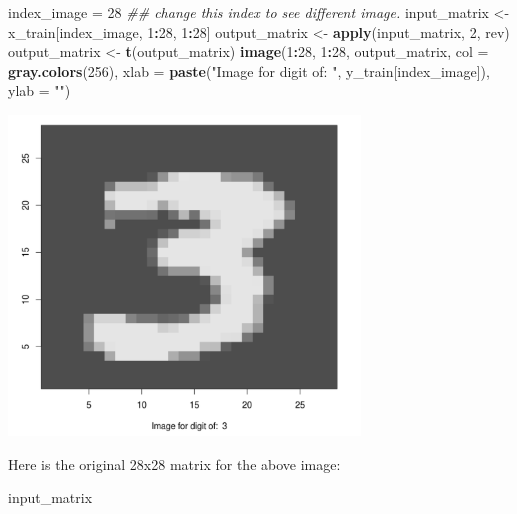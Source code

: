 \documentclass[12pt,]{krantz}
\makeatletter
\newenvironment{Shaded}{\begin{snugshade}}{\end{snugshade}}
\newcommand{\CommentTok}[1]{\textcolor[rgb]{0.37,0.37,0.37}{\textit{#1}}}
\newcommand{\DataTypeTok}[1]{\textcolor[rgb]{0.27,0.27,0.27}{#1}}
\newcommand{\DecValTok}[1]{\textcolor[rgb]{0.06,0.06,0.06}{#1}}
\newcommand{\KeywordTok}[1]{\textcolor[rgb]{0.27,0.27,0.27}{\textbf{#1}}}
\newcommand{\NormalTok}[1]{#1}
\newcommand{\OperatorTok}[1]{\textcolor[rgb]{0.43,0.43,0.43}{\textbf{#1}}}
\newcommand{\StringTok}[1]{\textcolor[rgb]{0.5,0.5,0.5}{#1}}
\newenvironment{kframe}{%
\medskip{}
\setlength{\fboxsep}{.8em}
 \def\at@end@of@kframe{}%
 \ifinner\ifhmode%
  \def\at@end@of@kframe{\end{minipage}}%
  \begin{minipage}{\columnwidth}%
 \fi\fi%
 \def\FrameCommand##1{\hskip\@totalleftmargin \hskip-\fboxsep
 \colorbox{shadecolor}{##1}\hskip-\fboxsep
     \hskip-\linewidth \hskip-\@totalleftmargin \hskip\columnwidth}%
 \MakeFramed {\advance\hsize-\width
   \@totalleftmargin\z@ \linewidth\hsize
   \@setminipage}}%
 {\par\unskip\endMakeFramed%
 \at@end@of@kframe}
\renewenvironment{Shaded}{\begin{kframe}}{\end{kframe}}
\makeatother
\begin{document}
\begin{Shaded}
\begin{Highlighting}[]
\NormalTok{index_image =}\StringTok{ }\DecValTok{28}  \CommentTok{## change this index to see different image.}
\NormalTok{input_matrix <-}\StringTok{ }\NormalTok{x_train[index_image, }\DecValTok{1}\OperatorTok{:}\DecValTok{28}\NormalTok{, }\DecValTok{1}\OperatorTok{:}\DecValTok{28}\NormalTok{]}
\NormalTok{output_matrix <-}\StringTok{ }\KeywordTok{apply}\NormalTok{(input_matrix, }\DecValTok{2}\NormalTok{, rev)}
\NormalTok{output_matrix <-}\StringTok{ }\KeywordTok{t}\NormalTok{(output_matrix)}
\KeywordTok{image}\NormalTok{(}\DecValTok{1}\OperatorTok{:}\DecValTok{28}\NormalTok{, }\DecValTok{1}\OperatorTok{:}\DecValTok{28}\NormalTok{, output_matrix, }\DataTypeTok{col =} \KeywordTok{gray.colors}\NormalTok{(}\DecValTok{256}\NormalTok{), }
    \DataTypeTok{xlab =} \KeywordTok{paste}\NormalTok{(}\StringTok{"Image for digit of: "}\NormalTok{, y_train[index_image]), }
    \DataTypeTok{ylab =} \StringTok{""}\NormalTok{)}
\end{Highlighting}
\end{Shaded}

\includegraphics[width=0.7\textwidth,height=\textheight]{images/mnist_image3.png}

Here is the original 28x28 matrix for the above image:

\begin{Shaded}
\begin{Highlighting}[]
\NormalTok{input_matrix}
\end{Highlighting}
\end{Shaded}
\end{document}
